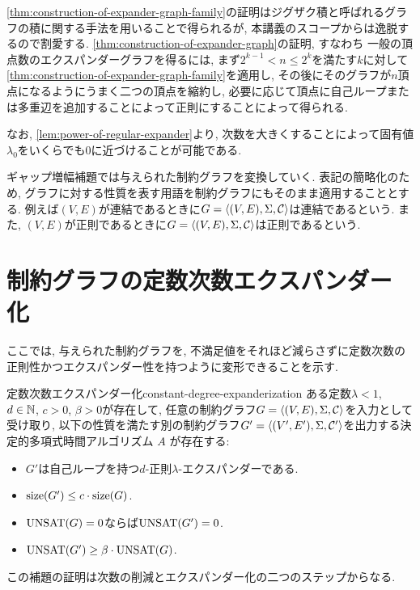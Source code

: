 \cref{thm:construction-of-expander-graph-family}の証明はジグザク積と呼ばれるグラフの積に関する手法を用いることで得られるが, 本講義のスコープからは逸脱するので割愛する.
\cref{thm:construction-of-expander-graph}の証明, すなわち
一般の頂点数のエクスパンダーグラフを得るには, まず$2^{k-1}< n \le 2^k$を満たす$k$に対して\cref{thm:construction-of-expander-graph-family}を適用し, その後にそのグラフが$n$頂点になるようにうまく二つの頂点を縮約し, 必要に応じて頂点に自己ループまたは多重辺を追加することによって正則にすることによって得られる.


なお, \cref{lem:power-of-regular-expander}より, 次数を大きくすることによって固有値$\lambda_0$をいくらでも$0$に近づけることが可能である.



ギャップ増幅補題では与えられた制約グラフを変換していく.
表記の簡略化のため, グラフに対する性質を表す用語を制約グラフにもそのまま適用することとする.
例えば$(V,E)$が連結であるときに$G=\langle(V,E),\Sigma,\mathcal{C}\rangle$は連結であるという.
また, $(V,E)$が正則であるときに$G=\langle(V,E),\Sigma,\mathcal{C}\rangle$は正則であるという.


\section{制約グラフの定数次数エクスパンダー化}

ここでは, 与えられた制約グラフを, 不満足値をそれほど減らさずに定数次数の正則性かつエクスパンダー性を持つように変形できることを示す.

\begin{lemma}{定数次数エクスパンダー化}{constant-degree-expanderization}
  ある定数$\lambda<1$, $d\in\mathbb{N}$, $c>0$, $\beta>0$が存在して,
  任意の制約グラフ$G=\langle(V,E),\Sigma,\mathcal{C}\rangle$を入力として受け取り, 以下の性質を満たす別の制約グラフ$G'=\langle(V',E'),\Sigma,\mathcal{C}'\rangle$を出力する決定的多項式時間アルゴリズム $A$ が存在する:
  \begin{itemize}
    \item $G'$は自己ループを持つ$d$-正則$\lambda$-エクスパンダーである.
    \item $\mathrm{size}(G') \le c\cdot \mathrm{size}(G)$.
    \item $\mathrm{UNSAT}(G)=0$ならば$\mathrm{UNSAT}(G')=0$.
    \item $\mathrm{UNSAT}(G') \ge \beta\cdot\mathrm{UNSAT}(G)$.
  \end{itemize}
\end{lemma}

この補題の証明は次数の削減とエクスパンダー化の二つのステップからなる.

